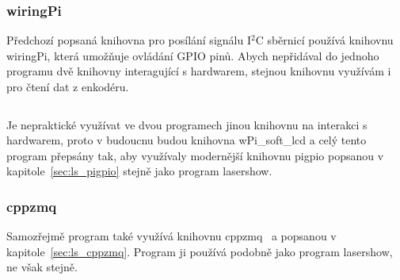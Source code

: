 \subsubsection{wiringPi}
Předchozí popsaná knihovna pro posílání signálu I$^{2}$C sběrnicí používá knihovnu wiringPi, která umožňuje ovládání GPIO pinů. Abych nepřidával do jednoho programu dvě knihovny interagující s hardwarem, stejnou knihovnu využívám i pro čtení dat z enkodéru.

\inputminted[frame=lines,fontsize=\footnotesize{}, linenos, breaklines]{cpp}{code_examples/wiringpi_isr.cpp}

Je nepraktické využívat ve dvou programech jinou knihovnu na interakci s hardwarem, proto v budoucnu budou knihovna wPi\_soft\_lcd a celý tento program přepsány tak, aby využívaly modernější knihovnu pigpio popsanou v kapitole~\ref{sec:ls_pigpio} stejně jako program lasershow.


\subsubsection{cppzmq}
Samozřejmě program také využívá knihovnu cppzmq~\cite{cppzmq} a popsanou v kapitole~\ref{sec:ls_cppzmq}. Program ji používá podobně jako program lasershow, ne však stejně.

